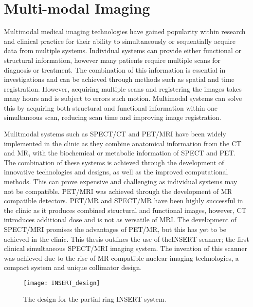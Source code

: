 \section{Multi-modal Imaging} %
Multimodal medical imaging technologies have gained popularity within research and clinical practice for their ability to simultaneously or sequentially acquire data from multiple systems. Individual systems can provide either functional or structural information, however many patients require multiple scans for diagnosis or treatment. The combination of this information is essential in investigations and can be achieved through methods such as spatial and time registration. However, acquiring multiple scans and registering the images takes many hours and is subject to errors such motion. Multimodal systems can solve this by acquiring both structural and functional information within one simultaneous scan, reducing scan time and improving image registration. 

Mulitmodal systems such as \acrlong{SPECT/CT} and \acrlong{PET/MRI} have been widely implemented in the clinic as they combine anatomical information from the \acrshort{CT} and \acrshort{MR}, with the biochemical or metabolic information of \acrshort{SPECT} and \acrshort{PET}. The combination of these systems is achieved through the development of innovative technologies and designs, as well as the improved computational methods. This can prove expensive and challenging as individual systems may not be compatible. \acrshort{PET/MRI} was achieved through the development of \acrshort{MR} compatible detectors. \acrshort{PET/MR} and \acrshort{SPECT/MR} have been highly successful in the clinic as it produces combined structural and functional images, however, \acrshort{CT} introduces additional dose and is not as versatile of \acrshort{MRI}. The development of \acrshort{SPECT/MRI} promises the advantages of \acrshort{PET/MR}, but this has yet to be achieved in the clinic. This thesis outlines the use of the\acrshort{INSERT} scanner; the first clinical simultaneous \acrshort{SPECT/MRI} imaging system. The invention of this scanner was achieved due to the rise of \acrshort{MR} compatible nuclear imaging technologies, a compact system and unique collimator design. 

\begin{figure}[htp]
    \centering
    \texttt{[image: INSERT\_design]} %
    \caption{The design for the partial ring INSERT system.} \label{fig:INSERT}
\end{figure}

